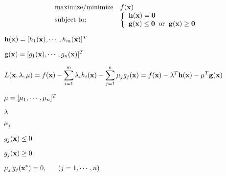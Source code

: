 \documentclass{article}
\def\lthtmlcheckvsize{\ifdim\ht\sizebox<\vsize 
  \ifdim\wd\sizebox<\hsize\expandafter\hfill\fi \expandafter\vfill
  \else\expandafter\vss\fi}%
\begin{document}
{\newpage\clearpage
{}%
\begin{displaymath}\begin{array}{ll}
\mbox{maximize/minimize} & f({\bf x})\\
\mbox{subject to:} &
\left\{ \begin{array}{l}
{\bf h}({\bf x})={\bf0}\\
{\bf g}({\bf x})\le{\bf0}\;\;\mbox{or}\;\;{\bf g}({\bf x})\ge{\bf0}
\end{array} \right.
\end{array}\end{displaymath}%
\lthtmldisplayZ
\lthtmlcheckvsize\clearpage}

{\newpage\clearpage
{}%
$ {\bf h}({\bf x})=[h_1({\bf x}),\cdots,h_m({\bf x})]^T$%
\lthtmlindisplaymathZ
\lthtmlcheckvsize\clearpage}

{\newpage\clearpage
{}%
$ {\bf g}({\bf x})=[g_1({\bf x}),\cdots,g_n({\bf x})]^T$%
\lthtmlindisplaymathZ
\lthtmlcheckvsize\clearpage}

{\newpage\clearpage
{}%
$\displaystyle L({\bf x},{\bf\lambda},{\bf\mu})
=f({\bf x})-\sum_{i=1}^m\lambda_i h_i({\bf x})-\sum_{j=1}^n\mu_j g_j({\bf x})
=f({\bf x})-{\bf\lambda}^T {\bf h}({\bf x})-{\bf\mu}^T{\bf g}({\bf x})$%
\lthtmlindisplaymathZ
\lthtmlcheckvsize\clearpage}

{\newpage\clearpage
{}%
$ {\bf\mu}=[\mu_1,\cdots,\mu_n]^T$%
\lthtmlindisplaymathZ
\lthtmlcheckvsize\clearpage}

{\newpage\clearpage
{}%
$ {\bf\lambda}$%
\lthtmlindisplaymathZ
\lthtmlcheckvsize\clearpage}

{\newpage\clearpage
{}%
$ \mu_j$%
\lthtmlindisplaymathZ
\lthtmlcheckvsize\clearpage}

{\newpage\clearpage
{}%
$ g_j({\bf x})\le 0$%
\lthtmlindisplaymathZ
\lthtmlcheckvsize\clearpage}

{\newpage\clearpage
{}%
$ g_j({\bf x})\ge 0$%
\lthtmlindisplaymathZ
\lthtmlcheckvsize\clearpage}

{\newpage\clearpage
{}%
$\displaystyle \mu_j\,g_j({\bf x}^*)=0,\;\;\;\;\;\;(j=1,\cdots,n)$%
\lthtmlindisplaymathZ
\lthtmlcheckvsize\clearpage}
\end{document}
